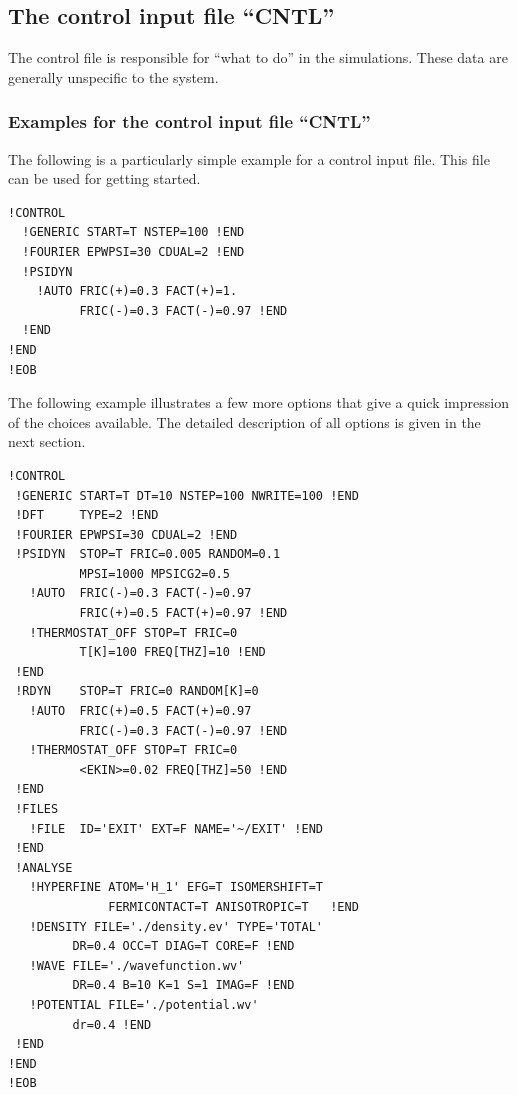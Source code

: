 \documentclass[final,12pt]{article}
\begin{document}
%
\subsection{The control input file ``CNTL''}

The control file is responsible for ``what to do'' in the
simulations. These data are generally unspecific to the system.

\subsubsection{Examples for the control input file ``CNTL''}
The following is a particularly simple example for a control input
file. This file can be used for getting started.

\begin{verbatim}
!CONTROL
  !GENERIC START=T NSTEP=100 !END   
  !FOURIER EPWPSI=30 CDUAL=2 !END
  !PSIDYN  
    !AUTO FRIC(+)=0.3 FACT(+)=1. 
          FRIC(-)=0.3 FACT(-)=0.97 !END
  !END
!END         
!EOB
\end{verbatim}

The following example illustrates a few more options that give a quick
impression of the choices available. The detailed description of all
options is given in the next section.

\begin{verbatim}
!CONTROL
 !GENERIC START=T DT=10 NSTEP=100 NWRITE=100 !END   
 !DFT     TYPE=2 !END
 !FOURIER EPWPSI=30 CDUAL=2 !END
 !PSIDYN  STOP=T FRIC=0.005 RANDOM=0.1 
          MPSI=1000 MPSICG2=0.5 
   !AUTO  FRIC(-)=0.3 FACT(-)=0.97 
          FRIC(+)=0.5 FACT(+)=0.97 !END
   !THERMOSTAT_OFF STOP=T FRIC=0 
          T[K]=100 FREQ[THZ]=10 !END 
 !END
 !RDYN    STOP=T FRIC=0 RANDOM[K]=0 
   !AUTO  FRIC(+)=0.5 FACT(+)=0.97 
          FRIC(-)=0.3 FACT(-)=0.97 !END
   !THERMOSTAT_OFF STOP=T FRIC=0 
          <EKIN>=0.02 FREQ[THZ]=50 !END
 !END
 !FILES
   !FILE  ID='EXIT' EXT=F NAME='~/EXIT' !END
 !END
 !ANALYSE 
   !HYPERFINE ATOM='H_1' EFG=T ISOMERSHIFT=T 
              FERMICONTACT=T ANISOTROPIC=T   !END
   !DENSITY FILE='./density.ev' TYPE='TOTAL' 
         DR=0.4 OCC=T DIAG=T CORE=F !END
   !WAVE FILE='./wavefunction.wv' 
         DR=0.4 B=10 K=1 S=1 IMAG=F !END
   !POTENTIAL FILE='./potential.wv'
         dr=0.4 !END
 !END
!END
!EOB
\end{verbatim}
\end{document}
